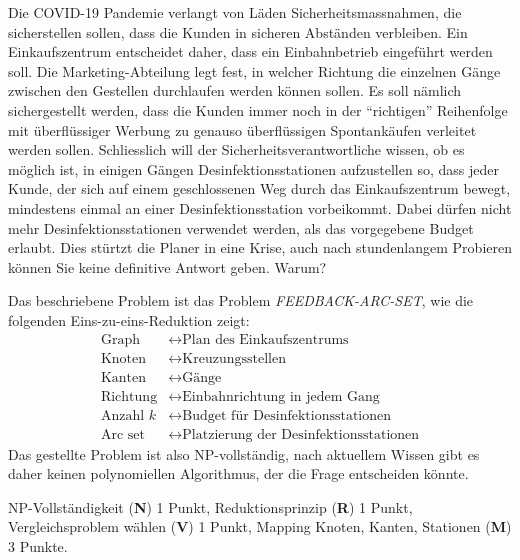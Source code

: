 Die COVID-19 Pandemie verlangt von Läden Sicherheitsmassnahmen, die
sicherstellen sollen, dass die Kunden in sicheren Abständen verbleiben.
Ein Einkaufszentrum entscheidet daher, dass ein Einbahnbetrieb
eingeführt werden soll.
Die Marketing-Abteilung legt fest, in welcher Richtung die einzelnen
Gänge zwischen den Gestellen durchlaufen werden können sollen.
Es soll nämlich sichergestellt werden, dass die Kunden immer noch 
in der ``richtigen'' Reihenfolge mit überflüssiger Werbung zu
genauso überflüssigen Spontankäufen verleitet werden sollen.
Schliesslich will der Sicherheitsverantwortliche wissen, ob es möglich
ist, in einigen Gängen Desinfektionsstationen aufzustellen so,
dass jeder Kunde, der sich auf einem geschlossenen Weg durch das
Einkaufszentrum bewegt, mindestens einmal an einer Desinfektionsstation
vorbeikommt.
Dabei dürfen nicht mehr Desinfektionsstationen verwendet werden, als
das vorgegebene Budget erlaubt.
Dies stürtzt die Planer in eine Krise, auch nach stundenlangem
Probieren können Sie keine definitive Antwort geben.
Warum?


\begin{loesung}
Das beschriebene Problem ist das Problem \textsl{FEEDBACK-ARC-SET},
wie die folgenden Eins-zu-eins-Reduktion zeigt:
\begin{align*}
\text{Graph} &\leftrightarrow \text{Plan des Einkaufszentrums}
\\
\text{Knoten}&\leftrightarrow \text{Kreuzungsstellen}
\\
\text{Kanten}&\leftrightarrow \text{Gänge}
\\
\text{Richtung}&\leftrightarrow \text{Einbahnrichtung in jedem Gang}
\\
\text{Anzahl $k$}&\leftrightarrow \text{Budget für Desinfektionsstationen}
\\
\text{Arc set}&\leftrightarrow \text{Platzierung der Desinfektionsstationen}
\end{align*}
Das gestellte Problem ist also NP-vollständig, nach aktuellem Wissen gibt
es daher keinen polynomiellen Algorithmus, der die Frage entscheiden könnte.
\end{loesung}

\begin{bewertung}
NP-Vollständigkeit ({\bf N}) 1 Punkt,
Reduktionsprinzip ({\bf R}) 1 Punkt,
Vergleichsproblem wählen ({\bf V}) 1 Punkt,
Mapping Knoten, Kanten, Stationen ({\bf M}) 3 Punkte.
\end{bewertung}


